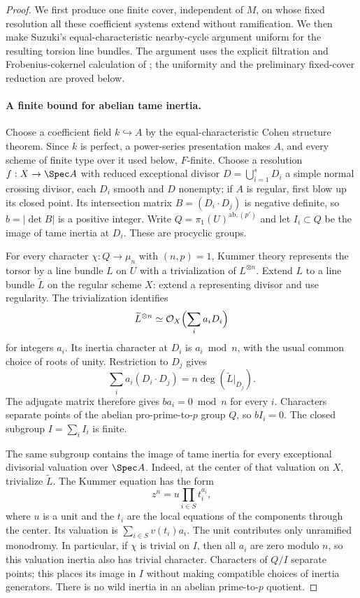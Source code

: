\begin{proof}
We first produce one finite cover, independent of $M$, on whose
fixed resolution all these coefficient systems extend without
ramification. We then make Suzuki's equal-characteristic
nearby-cycle argument uniform for the resulting torsion line bundles.
The argument uses the explicit filtration and Frobenius-cokernel
calculation of \cite[Propositions 2.1 and 3.1--3.4, pp.~4--7]{Suzuki2023};
the uniformity and the preliminary fixed-cover reduction are proved below.

\paragraph{A finite bound for abelian tame inertia.}
Choose a coefficient field $k\hookrightarrow A$ by the equal-characteristic
Cohen structure theorem. Since $k$ is perfect, a power-series presentation
makes $A$, and every scheme of finite type over it used below, $F$-finite.
Choose a resolution $f:X\to\Spec A$ with reduced exceptional divisor
$D=\bigcup_{i=1}^s D_i$ a simple normal crossing divisor, each $D_i$
smooth and $D$ nonempty; if $A$ is regular, first blow up its closed point.
Its intersection matrix $B=(D_i\cdot D_j)$ is negative definite,
so $b=|\det B|$ is a positive integer. Write
$Q=\pi_1(U)^{\mathrm{ab},(p')}$ and let $I_i\subset Q$ be the image
of tame inertia at $D_i$. These are procyclic groups.

For every character $\chi:Q\to\mu_n$ with $(n,p)=1$, Kummer theory
represents the torsor by a line bundle $L$ on $U$ with a trivialization
of $L^{\otimes n}$. Extend $L$ to a line bundle $\widetilde L$ on the
regular scheme $X$: extend a representing divisor and use regularity.
The trivialization identifies
\[
 \widetilde L^{\otimes n}\simeq
 \mathcal O_X\Bigl(\sum_i a_iD_i\Bigr)
\]
for integers $a_i$. Its inertia character at $D_i$ is $a_i\bmod n$,
with the usual common choice of roots of unity. Restriction to $D_j$
gives
\[
 \sum_i a_i(D_i\cdot D_j)
       =n\deg(\widetilde L|_{D_j}).
\]
The adjugate matrix therefore gives $ba_i=0\bmod n$ for every $i$.
Characters separate points of the abelian pro-prime-to-$p$ group $Q$,
so $bI_i=0$. The closed subgroup $I=\sum_i I_i$ is finite.

The same subgroup contains the image of tame inertia for every
exceptional divisorial valuation over $\Spec A$. Indeed, at the center
of that valuation on $X$, trivialize $\widetilde L$. The Kummer equation
has the form
\[
 z^n=u\prod_{i\in S}t_i^{a_i},
\]
where $u$ is a unit and the $t_i$ are the local equations of the
components through the center. Its valuation is
$\sum_{i\in S}v(t_i)a_i$. The unit contributes only unramified
monodromy. In particular, if $\chi$ is trivial on $I$, then all $a_i$ are zero
modulo $n$, so this valuation inertia also has trivial character.
Characters of $Q/I$ separate points; this places its image in $I$
without making compatible choices of inertia generators.
There is no wild inertia in an abelian prime-to-$p$ quotient.


\end{proof}
